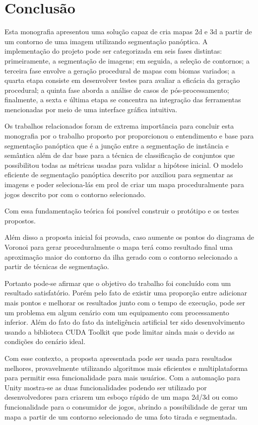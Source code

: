 \section{Conclusão}

Esta monografia apresentou uma solução capaz de cria mapas 2d e 3d a partir de um contorno de uma imagem utilizando segmentação panóptica. A implementação do projeto pode ser categorizada em seis fases distintas: primeiramente, a segmentação de imagens; em seguida, a seleção de contornos; a terceira fase envolve a geração procedural de mapas com biomas variados; a quarta etapa consiste em desenvolver testes para avaliar a eficácia da geração procedural; a quinta fase aborda a análise de casos de pós-processamento; finalmente, a sexta e última etapa se concentra na integração das ferramentas mencionadas por meio de uma interface gráfica intuitiva.

Os trabalhos relacionados foram de extrema importância para concluir esta monografia por o trabalho proposto por  proporcionou o entendimento e base para segmentação panóptica que é a junção entre a segmentação de instância e semântica além de dar base para a técnica de classificação de conjuntos que possibilitou todas as métricas usadas para validar a hipótese inicial. O modelo eficiente de segmentação panóptica descrito por  auxiliou para segmentar as imagens e poder seleciona-lás em prol de criar um mapa proceduralmente para jogos descrito por  com o contorno selecionado.

Com essa fundamentação teórica foi possível construir o protótipo e os testes propostos.

Além disso a proposta inicial foi provada, caso aumente os pontos do diagrama de Voronoi para gerar proceduralmente o mapa terá como resultado final uma aproximação maior do contorno da ilha gerado com o contorno selecionado a partir de técnicas de segmentação.

Portanto pode-se afirmar que o objetivo do trabalho foi concluído com um resultado satisfatório. Porém pelo fato de existir uma proporção entre adicionar mais pontos e melhorar os resultados junto com o tempo de execução, pode ser um problema em algum cenário com um equipamento com processamento inferior. Além do fato do fato da inteligência artificial ter sido desenvolvimento usando a biblioteca CUDA Toolkit que pode limitar ainda mais o devido as condições do cenário ideal.

Com esse contexto, a proposta apresentada pode ser usada para resultados melhores, provavelmente utilizando algoritmos mais eficientes e multiplataforma para permitir essa funcionalidade para mais usuários. Com a automação para Unity mostra-se as duas funcionalidades podendo ser utilizado por desenvolvedores para criarem um esboço rápido de um mapa 2d/3d ou como funcionalidade para o consumidor de jogos, abrindo a possibilidade de gerar um mapa a partir de um contorno selecionado de uma foto tirada e segmentada.